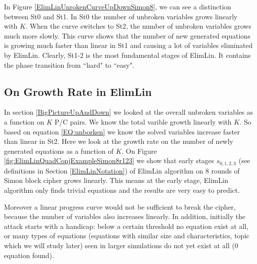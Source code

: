In Figure \ref{ElimLinUnrokenCurveUpDownSimon8}, we can see a distinction between St0 and St1. In St0 the number of unbroken variables grows linearly with $K$. When the curve switches to St2, the number of unbroken variables grows much more slowly. This curve shows that the number of new generated equations is growing much faster than linear in St1 and causing a lot of variables eliminated by ElimLin. Clearly, St1-2 is the most fundamental stages of ElimLin. It contains the phase transition from ``hard" to ``easy".



\subsection{On Growth Rate in ElimLin}
\label{SuperLinearGrowth}
In section \ref{BigPictureUpAndDown} we looked at the overall unbroken variables as a function on $K$ P/C pairs. We know the total varible growth linearly with $K$. So based on equation \ref{EQ:unborken} we know the solved variables increase faster than linear in St2. Here we look at the growth rate on the number of newly generated equations as a function of $K$.  On Figure \ref{fig:ElimLinQuadConjExampleSimon8r123} we show that early stages $s_{0,1,2,3}$ (see definitions in Section \ref{ElimLinNotation}) of ElimLin algorithm on 8 rounds of Simon block cipher grows linearly. This means at the early stage, ElimLin algorithm only finds trivial equations and the results are very easy to predict. 

Moreover a linear progress curve would not be sufficient to break the cipher, 
because the number of variables also increases linearly. 
In addition, initially the attack starts with a handicap: below a certain threshold no equation exist at all, or many types of equations (equations with similar size and
characteristics, topic which we will study later) seen in larger simulations do not yet exist at all (0 equation found).



